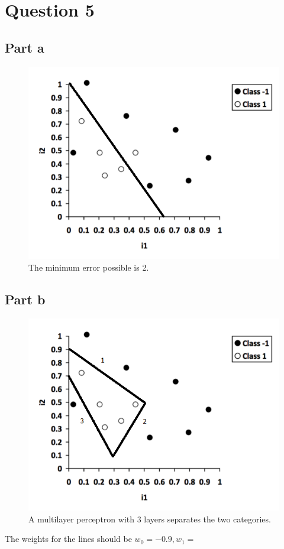 \documentclass[12pt]{article}
\begin{document}
\section*{Question 5}

\subsection*{Part a}

\begin{figure}[H]
    \centering
    \includegraphics[width=1\textwidth]{question_5_plot_a}
    \caption{The minimum error possible is 2.}
    \label{fig:question_5_plot_a}
\end{figure}

\subsection*{Part b}

\begin{figure}[H]
    \centering
    \includegraphics[width=1\textwidth]{question_5_plot_b}
    \caption{A multilayer perceptron with 3 layers separates the two categories.}
    \label{fig:question_5_plot_b}
\end{figure}

The weights for the lines should be $w_0 = -0.9, w_1 = $
\end{document}
